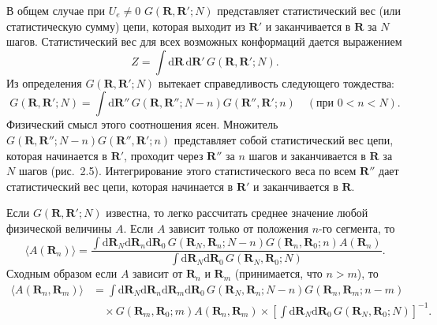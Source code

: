 \documentclass[12pt,a4paper]{article}
\begin{document}
В общем случае при $U_e \ne 0$ $G(\boldsymbol{R}, \boldsymbol{R}'; N)$ представляет статистический вес (или статистическую сумму) цепи, которая выходит из $\boldsymbol{R}'$ и заканчивается в $\boldsymbol{R}$ за $N$ шагов. Статистический вес для всех возможных конформаций дается выражением
\begin{equation}
Z = \int\!\mathrm{d}\boldsymbol{R}\,\mathrm{d}\boldsymbol{R}'\,G(\boldsymbol{R}, \boldsymbol{R}'; N). \tag{2.48}
\end{equation}
Из определения $G(\boldsymbol{R}, \boldsymbol{R}'; N)$ вытекает справедливость следующего тождества:
\begin{equation}
G(\boldsymbol{R}, \boldsymbol{R}'; N) = \int\!\mathrm{d}\boldsymbol{R}''\,G(\boldsymbol{R}, \boldsymbol{R}''; N - n)G(\boldsymbol{R}'', \boldsymbol{R}'; n) \quad (\text{при } 0 < n < N). \tag{2.49}
\end{equation}
Физический смысл этого соотношения ясен. Множитель $G(\boldsymbol{R}, \boldsymbol{R}''; N - n)G(\boldsymbol{R}'', \boldsymbol{R}'; n)$ представляет собой статистический вес цепи, которая начинается в $\boldsymbol{R}'$, проходит через $\boldsymbol{R}''$ за $n$ шагов и заканчивается в $\boldsymbol{R}$ за $N$ шагов (рис.~2.5). Интегрирование этого статистического веса по всем $\boldsymbol{R}''$ дает статистический вес цепи, которая начинается в $\boldsymbol{R}'$ и заканчивается в $\boldsymbol{R}$.

Если $G(\boldsymbol{R}, \boldsymbol{R}'; N)$ известна, то легко рассчитать среднее значение любой физической величины $A$. Если $A$ зависит только от положения $n$-го сегмента, то
\begin{equation}
\langle A(\boldsymbol{R}_n)\rangle = \frac{\displaystyle\int\!\mathrm{d}\boldsymbol{R}_N\mathrm{d}\boldsymbol{R}_n\mathrm{d}\boldsymbol{R}_0\,G(\boldsymbol{R}_N, \boldsymbol{R}_n; N - n)G(\boldsymbol{R}_n, \boldsymbol{R}_0; n)A(\boldsymbol{R}_n)}{\displaystyle\int\!\mathrm{d}\boldsymbol{R}_N\mathrm{d}\boldsymbol{R}_0\,G(\boldsymbol{R}_N, \boldsymbol{R}_0; N)}. \tag{2.50}
\end{equation}
Сходным образом если $A$ зависит от $\boldsymbol{R}_n$ и $\boldsymbol{R}_m$ (принимается, что $n > m$), то
\begin{align}
\langle A(\boldsymbol{R}_n, \boldsymbol{R}_m)\rangle &= \int\!\mathrm{d}\boldsymbol{R}_N\mathrm{d}\boldsymbol{R}_n\mathrm{d}\boldsymbol{R}_m\mathrm{d}\boldsymbol{R}_0\,G(\boldsymbol{R}_N, \boldsymbol{R}_n; N - n)G(\boldsymbol{R}_n, \boldsymbol{R}_m; n - m) \nonumber\\
&\quad \times G(\boldsymbol{R}_m, \boldsymbol{R}_0; m)A(\boldsymbol{R}_n, \boldsymbol{R}_m)\times\left[\int\!\mathrm{d}\boldsymbol{R}_N\mathrm{d}\boldsymbol{R}_0\,G(\boldsymbol{R}_N, \boldsymbol{R}_0; N)\right]^{-1}. \tag{2.51}
\end{align}
\end{document}
